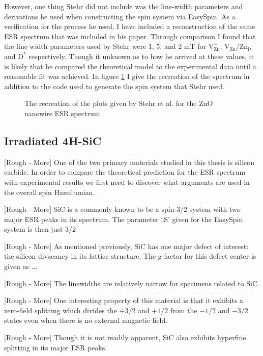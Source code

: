 \documentclass[oneside, astronomy, noacknowlegments]{BYUPhys}
\begin{document}
However, one thing Stehr did not include was the line-width parameters and derivations he used when constructing the spin system via EasySpin. As a verification for the process he used, I have included a reconstruction of the same ESR spectrum that was included in his paper. Through comparison I found that the line-width parameters used by Stehr were $1$, $5$, and $2$ mT for 
$\text{V}_{\text{Zn}}^{-}$, $\text{V}_{\text{Zn}}/\text{Zn}_{\text{i}}$, and $\text{D}^{*}$ respectively. Though it unknown as to how he arrived at these values, it is likely that he compared the theoretical model to the experimental data until a reasonable fit was achieved. In figure \ref{fig:StehrRec} I give the recreation of the spectrum in addition to the code used to generate the spin system that Stehr used.

\begin{figure}
    \caption[Recreation of ZnO Nanowire ESR]{\label{fig:StehrRec}
     The recreation of the plots given by Stehr et al. for the ZnO nanowire ESR spectrum}
 \end{figure}

\subsection{Irradiated 4H-SiC}

[Rough - More] One of the two primary materials studied in this thesis is silicon carbide. In order to compare the theoretical prediction for the ESR spectrum with experimental results we first need to discover what arguments are used in the overall spin Hamiltonian.

[Rough - More] SiC is a commonly known to be a spin-3/2 system with two major ESR peaks in its spectrum. The parameter ‘.S’ given for the EasySpin system is then just $3/2$

[Rough - More] As mentioned previously, SiC has one major defect of interest: the silicon divacancy in its lattice structure. The g-factor for this defect center is given as ...

[Rough - More] The linewidths are relatively narrow for specimens related to SiC.

[Rough - More] One interesting property of this material is that it exhibits a zero-field splitting which divides the $+3/2$ and $+1/2$ from the $-1/2$ and $-3/2$ states even when there is no external magnetic field.

[Rough - More] Though it is not readily apparent, SiC also exhibits hyperfine splitting in its major ESR peaks.
\end{document}
